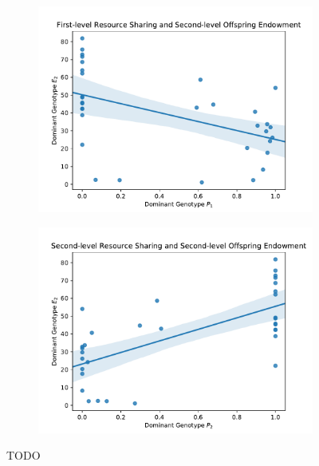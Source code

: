 \begin{figure}[t]
\begin{center}

\begin{subfigure}[b]{\columnwidth}
  \includegraphics[width=\columnwidth]{img/champion_res_pool1_vs_champion_endowment2}
  \label{fig:champion_res_pool1_vs_champion_endowment2}
\end{subfigure}

\begin{subfigure}[b]{\columnwidth}
  \includegraphics[width=\columnwidth]{img/champion_res_pool2_vs_champion_endowment2}
  \label{fig:champion_res_pool2_vs_champion_endowment2}
\end{subfigure}

\caption{
TODO
}
\label{fig:endowment}
\end{center}
\end{figure}
